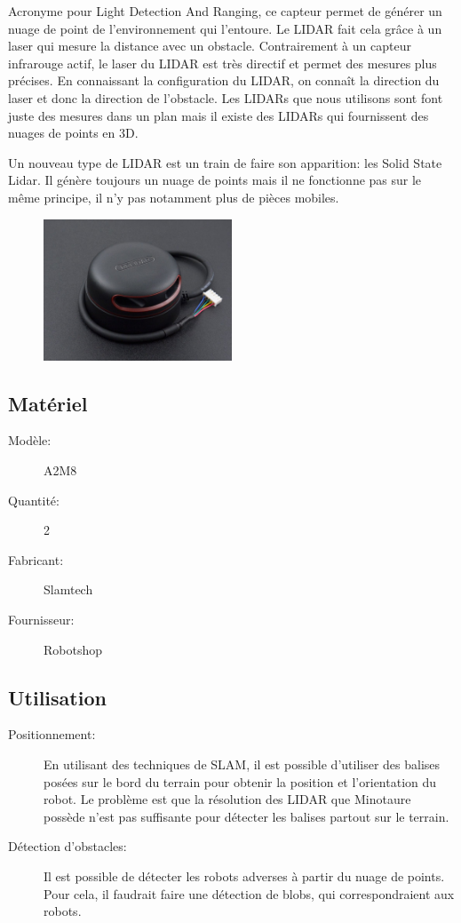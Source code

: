 \documentclass[a4paper, 11pt]{report}
\begin{document}
Acronyme pour Light Detection And Ranging, ce capteur permet de générer un nuage de point de l'environnement qui l'entoure. Le LIDAR fait cela grâce à un laser qui mesure la distance avec un obstacle. Contrairement à un capteur infrarouge actif, le laser du LIDAR est très directif et permet des mesures plus précises. En connaissant la configuration du LIDAR, on connaît la direction du laser et donc la direction de l'obstacle. Les LIDARs que nous utilisons sont font juste des mesures dans un plan mais il existe des LIDARs qui fournissent des nuages de points en 3D.

Un nouveau type de LIDAR est un train de faire son apparition: les Solid State Lidar. Il génère toujours un nuage de points mais il ne fonctionne pas sur le même principe, il n'y pas notamment plus de pièces mobiles. 

\begin{figure}[h!]
\begin{centering}
\includegraphics[width=0.5\textwidth]{images/RPLidar.jpg}
\par\end{centering}
\end{figure}

\subsection{Matériel}
\begin{description}
\item[Modèle:] A2M8
\item[Quantité:]2
\item[Fabricant:]Slamtech
\item[Fournisseur:]Robotshop
\end{description}


\subsection{Utilisation}
\begin{description}
\item[Positionnement:]En utilisant des techniques de SLAM, il est possible d'utiliser des balises posées sur le bord du terrain pour obtenir la position et l'orientation du robot. Le problème est que la résolution des LIDAR que Minotaure possède n'est pas suffisante pour détecter les balises partout sur le terrain.
\item[Détection d'obstacles:] Il est possible de détecter les robots adverses à partir du nuage de points. Pour cela, il faudrait faire une détection de blobs, qui correspondraient aux robots.
\end{description}
\end{document}
